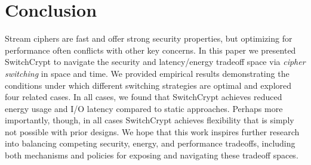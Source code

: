 \section{Conclusion}\label{sec:conclusion}

Stream ciphers are fast and offer strong security properties, but optimizing for
performance often conflicts with other key concerns. In this paper we presented
SwitchCrypt to navigate the security and latency/energy tradeoff space via
\emph{cipher switching} in space and time. We provided empirical results
demonstrating the conditions under which different switching strategies are
optimal and explored four related cases. In all cases, we found that SwitchCrypt
achieves reduced energy usage and I/O latency compared to static approaches.
Perhaps more importantly, though, in all cases SwitchCrypt achieves flexibility
that is simply not possible with prior designs.  We hope that this work inspires
further research into balancing competing security, energy, and performance
tradeoffs, including both mechanisms and policies for exposing and navigating
these tradeoff spaces.

